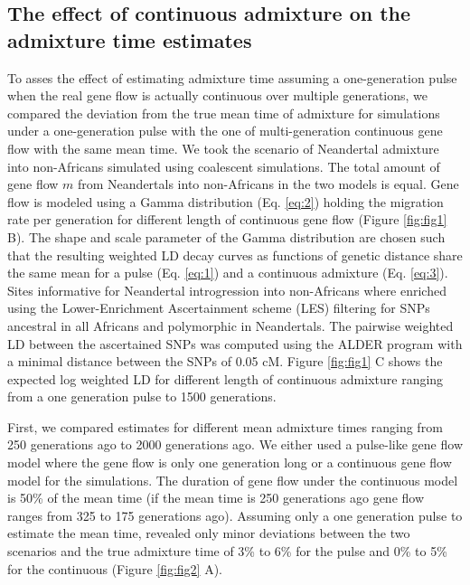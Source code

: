 \documentclass[]{article}
\begin{document}
\subsection{The effect of continuous admixture on the admixture time estimates}\label{the effect of continuous admixture on the admixture time estimates}


To asses the effect of estimating admixture time assuming a one-generation pulse when the real gene flow is actually continuous over multiple generations,
we compared the deviation from the true mean time of admixture for simulations under a one-generation pulse with the one of multi-generation continuous gene flow with the same mean time. We took the scenario of Neandertal admixture into non-Africans simulated using coalescent simulations.
The total amount of gene flow \(m\) from Neandertals into non-Africans
in the two models is equal. Gene flow is modeled using a Gamma
distribution (Eq. \ref{eq:2}) holding the migration rate per generation
for different length of continuous gene flow (Figure \ref{fig:fig1} B).
The shape and scale parameter of the Gamma distribution are chosen such
that the resulting weighted LD decay curves as functions of genetic
distance share the same mean for a pulse (Eq. \ref{eq:1}) and a
continuous admixture (Eq. \ref{eq:3}). Sites informative for Neandertal
introgression into non-Africans where enriched using the
Lower-Enrichment Ascertainment scheme (LES) filtering for SNPs ancestral in
all Africans and polymorphic in Neandertals. The pairwise weighted LD
between the ascertained SNPs was computed using the ALDER program with a minimal distance between the SNPs of 0.05 cM.
Figure \ref{fig:fig1} C shows the expected log weighted LD for different
length of continuous admixture ranging from a one generation pulse to
1500 generations.

First, we compared estimates for different mean admixture times ranging
from 250 generations ago to 2000 generations ago. We either used a
pulse-like gene flow model where the gene flow is only one generation
long or a continuous gene flow model for the simulations. The duration
of gene flow under the continuous model is 50\% of the mean time (if the
mean time is 250 generations ago gene flow ranges from 325 to 175
generations ago). Assuming only a one generation pulse to estimate the
mean time, revealed only minor deviations between the two scenarios and
the true admixture time of 3\% to 6\% for the pulse and 0\% to 5\% for
the continuous (Figure \ref{fig:fig2} A).
\end{document}
